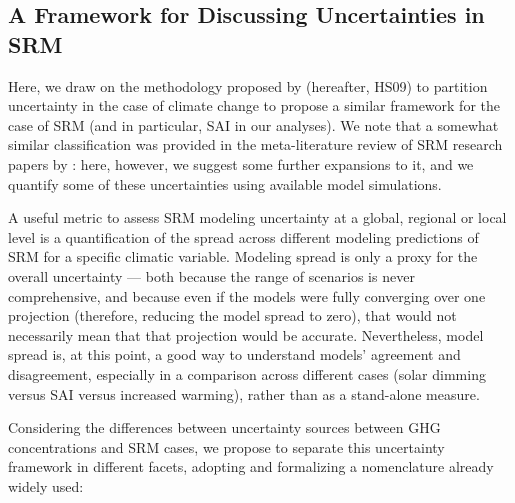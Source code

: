 \documentclass[draft]{agujournal2019}
\begin{document}
\subsection{A Framework for Discussing Uncertainties in SRM}

Here, we draw on the methodology proposed by  (hereafter, HS09) to partition uncertainty in the case of climate change to propose a similar framework for the case of SRM (and in particular, SAI in our analyses). We note that a somewhat similar classification was provided in the meta-literature review of SRM research papers by : here, however, we suggest some further expansions to it, and we quantify some of these uncertainties using available model simulations.

A useful metric to assess SRM modeling uncertainty at a global, regional or local level is a quantification of the spread across different modeling predictions of SRM for a specific climatic variable. Modeling spread is only a proxy for the overall uncertainty --- both because the range of scenarios is never comprehensive, and because even if the models were fully converging over one projection (therefore, reducing the model spread to zero), that would not necessarily mean that that projection would be accurate. Nevertheless, model spread is, at this point, a good way to understand models' agreement and disagreement, especially in a comparison across different cases (solar dimming versus SAI versus increased warming), rather than as a stand-alone measure.

Considering the differences between uncertainty sources between GHG concentrations and SRM cases, we propose to separate this uncertainty framework in different facets, adopting and formalizing a nomenclature already widely used:
\end{document}
